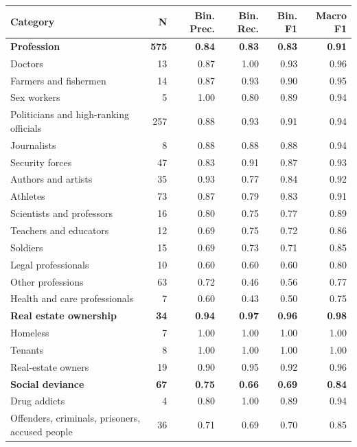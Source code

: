 \begin{table}[htb]
\centering
\scriptsize
\begin{tabular}{l r r r r r}
\toprule
Category & N & Bin. Prec. & Bin. Rec. & Bin. F1 & Macro F1 \\
\midrule
\addlinespace
\textbf{Profession} & \textbf{575} & \textbf{0.84} & \textbf{0.83} & \textbf{0.83} & \textbf{0.91} \\
\quad Doctors & 13 & 0.87 & 1.00 & 0.93 & 0.96 \\
\quad Farmers and fishermen & 14 & 0.87 & 0.93 & 0.90 & 0.95 \\
\quad Sex workers & 5 & 1.00 & 0.80 & 0.89 & 0.94 \\
\quad Politicians and high-ranking officials & 257 & 0.88 & 0.93 & 0.91 & 0.94 \\
\quad Journalists & 8 & 0.88 & 0.88 & 0.88 & 0.94 \\
\quad Security forces & 47 & 0.83 & 0.91 & 0.87 & 0.93 \\
\quad Authors and artists & 35 & 0.93 & 0.77 & 0.84 & 0.92 \\
\quad Athletes & 73 & 0.87 & 0.79 & 0.83 & 0.91 \\
\quad Scientists and professors & 16 & 0.80 & 0.75 & 0.77 & 0.89 \\
\quad Teachers and educators & 12 & 0.69 & 0.75 & 0.72 & 0.86 \\
\quad Soldiers & 15 & 0.69 & 0.73 & 0.71 & 0.85 \\
\quad Legal professionals & 10 & 0.60 & 0.60 & 0.60 & 0.80 \\
\quad Other professions & 63 & 0.72 & 0.46 & 0.56 & 0.77 \\
\quad Health and care professionals & 7 & 0.60 & 0.43 & 0.50 & 0.75 \\
\addlinespace
\textbf{Real estate ownership} & \textbf{34} & \textbf{0.94} & \textbf{0.97} & \textbf{0.96} & \textbf{0.98} \\
\quad Homeless & 7 & 1.00 & 1.00 & 1.00 & 1.00 \\
\quad Tenants & 8 & 1.00 & 1.00 & 1.00 & 1.00 \\
\quad Real-estate owners & 19 & 0.90 & 0.95 & 0.92 & 0.96 \\
\addlinespace
\textbf{Social deviance} & \textbf{67} & \textbf{0.75} & \textbf{0.66} & \textbf{0.69} & \textbf{0.84} \\
\quad Drug addicts & 4 & 0.80 & 1.00 & 0.89 & 0.94 \\
\quad Offenders, criminals, prisoners, accused people & 36 & 0.71 & 0.69 & 0.70 & 0.85 \\

\end{tabular}
\end{table}
